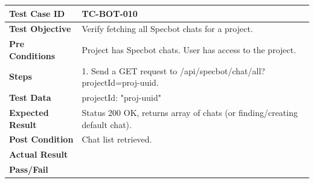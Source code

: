 \begin{longtable}{|p{}|p{}|}
\hline
\textbf{Test Case ID} & TC-BOT-010 \\ \hline
\textbf{Test Objective} & Verify fetching all Specbot chats for a project. \\ \hline
\textbf{Pre Conditions} & Project has Specbot chats. User has access to the project. \\ \hline
\textbf{Steps} & 
1. Send a GET request to /api/specbot/chat/all?projectId=proj-uuid. \\ \hline
\textbf{Test Data} & projectId: "proj-uuid" \\ \hline
\textbf{Expected Result} & Status 200 OK, returns array of chats (or finding/creating default chat). \\ \hline
\textbf{Post Condition} & Chat list retrieved. \\ \hline
\textbf{Actual Result} &  \\ \hline
\textbf{Pass/Fail} &  \\ \hline
\end{longtable}